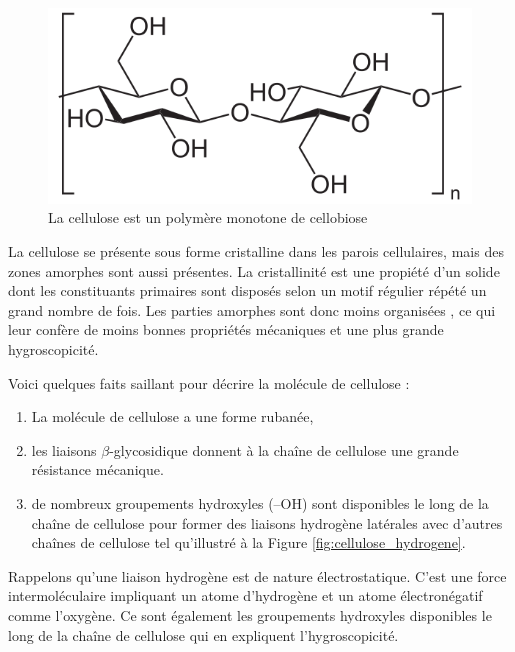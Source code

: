 \begin{figure}[h]
\centering
\includegraphics[scale=0.3]{img/cellulose}
\caption{La cellulose est un polymère monotone de cellobiose}
\label{fig:cellulose}
\end{figure}

La cellulose se présente sous forme cristalline dans les parois cellulaires, mais des zones amorphes sont aussi présentes. La cristallinité est une propiété d'un solide dont les constituants primaires sont disposés selon un motif régulier répété un grand nombre de fois. Les parties amorphes sont donc moins \og organisées \fg, ce qui leur confère de moins bonnes propriétés mécaniques et une plus grande hygroscopicité. 

Voici quelques faits saillant pour décrire la molécule de cellulose :

\begin{enumerate}
\item La molécule de cellulose a une forme rubanée,

\item les liaisons $\beta$-glycosidique donnent à la chaîne de cellulose une grande résistance mécanique. 

\item de nombreux groupements hydroxyles (--OH) sont disponibles le long de la chaîne de cellulose pour former des liaisons hydrogène latérales avec d'autres chaînes de cellulose tel qu'illustré à la Figure \ref{fig:cellulose_hydrogene}.\\
\end{enumerate}

Rappelons qu'une liaison hydrogène est de nature électrostatique. C'est une force intermoléculaire impliquant un atome d'hydrogène et un atome électronégatif comme l'oxygène. Ce sont également les groupements hydroxyles disponibles le long de la chaîne de cellulose qui en expliquent l'hygroscopicité.

